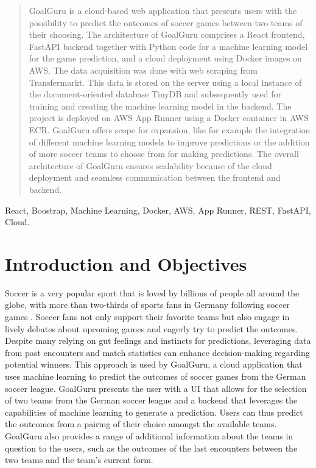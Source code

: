 \documentclass[conference,a4paper,flushend]{cs-techrep}
\begin{document}
\selectlanguage{\cstechrepLang}

\maketitle

\begin{abstract}
GoalGuru is a cloud-based web application that presents users with the possibility to predict the outcomes of soccer games between two teams of their choosing. The architecture of GoalGuru comprises a React frontend, FastAPI backend together with Python code for a machine learning model for the game prediction, and a cloud deployment using Docker images on AWS. The data acquisition was done with web scraping from Transfermarkt. This data is stored on the server using a local instance of the document-oriented database TinyDB and subsequently used for training and creating the machine learning model in the backend. The project is deployed on AWS App Runner using a Docker container in AWS ECR. GoalGuru offers scope for expansion, like for example the integration of different machine learning models to improve predictions or the addition of more soccer teams to choose from for making predictions. The overall architecture of GoalGuru ensures scalability because of the cloud deployment and seamless communication between the frontend and backend.
\end{abstract}

\begin{IEEEkeywords}
React, Boostrap, Machine Learning, Docker, AWS, App Runner, REST, FastAPI, Cloud.
\end{IEEEkeywords}


\section{Introduction and Objectives}

Soccer is a very popular sport that is loved by billions of people all around the globe, with more than two-thirds of sports fans in Germany following soccer games \cite{noauthor_infographic_2024}. Soccer fans not only support their favorite teams but also engage in lively debates about upcoming games and eagerly try to predict the outcomes. Despite many relying on gut feelings and instincts for predictions, leveraging data from past encounters and match statistics can enhance decision-making regarding potential winners. This approach is used by GoalGuru, a cloud application that uses machine learning to predict the outcomes of soccer games from the German soccer league. GoalGuru presents the user with a UI that allows for the selection of two teams from the German soccer league and a backend that leverages the capabilities of machine learning to generate a prediction. Users can thus predict the outcomes from a pairing of their choice amongst the available teams. GoalGuru also provides a range of additional information about the teams in question to the users, such as the outcomes of the last encounters between the two teams and the team's current form.
\end{document}

